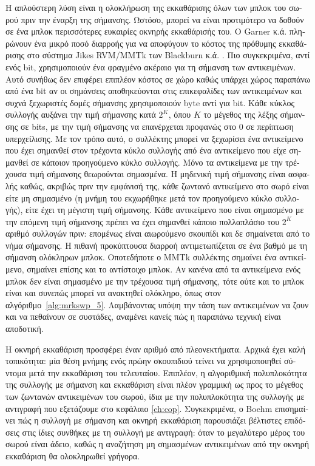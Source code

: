 \begin{greek}
Η απλούστερη λύση είναι η ολοκλήρωση της εκκαθάρισης όλων των
μπλοκ του σωρού πριν την έναρξη της σήμανσης. Ωστόσο, μπορεί
να είναι προτιμότερο να δοθούν σε ένα μπλοκ περισσότερες ευκαιρίες
οκνηρής εκκαθάρισής του. Ο Garner κ.ά. \cite{DBLP:conf/iwmm/GarnerBF07}
πληρώνουν ένα μικρό ποσό διαρροής για να αποφύγουν το κόστος
της πρόθυμης εκκαθάρισης στο σύστημα Jikes RVM/MMTk των Blackburn
κ.ά. \cite{DBLP:conf/iwmm/BlackburnH04}. Πιο συγκεκριμένα, αντί
ενός bit, χρησιμοποιούν ένα φραγμένο ακέραιο για τη σήμανση των
αντικειμένων. Αυτό συνήθως δεν επιφέρει επιπλέον κόστος σε χώρο
καθώς υπάρχει χώρος παραπάνω από ένα bit αν οι σημάνσεις αποθηκεύονται
στις επικεφαλίδες των αντικειμένων και συχνά ξεχωριστές δομές
σήμανσης χρησιμοποιούν byte αντί για bit. Κάθε κύκλος συλλογής
αυξάνει την τιμή σήμανσης κατά $2^K$, όπου $K$ το μέγεθος της
λέξης σήμανσης σε bits, με την τιμή σήμανσης να επανέρχεται
προφανώς στο $0$ σε περίπτωση υπερχείλισης. Με τον τρόπο αυτό,
ο συλλέκτης μπορεί να ξεχωρίσει ένα αντικείμενο που έχει σημανθεί
στον τρέχοντα κύκλο συλλογής από ένα αντικείμενο που είχε
σημανθεί σε κάποιον προηγούμενο κύκλο συλλογής. Μόνο τα αντικείμενα
με την τρέχουσα τιμή σήμανσης θεωρούνται σημασμένα. Η μηδενική
τιμή σήμανσης είναι ασφαλής καθώς, ακριβώς πριν την εμφάνισή
της, κάθε ζωντανό αντικείμενο στο σωρό είναι είτε μη σημασμένο
(η μνήμη του εκχωρήθηκε μετά τον προηγούμενο κύκλο συλλογής),
είτε έχει τη μέγιστη τιμή σήμανσης. Κάθε αντικείμενο που είναι
σημασμένο με την επόμενη τιμή σήμανσης πρέπει να έχει σημανθεί
κάποιο πολλαπλάσιο του $2^K$ αριθμό συλλογών πριν: επομένως
είναι αιωρούμενο σκουπίδι και δε σημαίνεται από το νήμα σήμανσης.
Η πιθανή προκύπτουσα διαρροή αντιμετωπίζεται σε ένα βαθμό
με τη σήμανση ολόκληρων μπλοκ. Οποτεδήποτε ο MMTk συλλέκτης
σημαίνει ένα αντικείμενο, σημαίνει επίσης και το αντίστοιχο
μπλοκ. Αν κανένα από τα αντικείμενα ενός μπλοκ δεν είναι
σημασμένο με την τρέχουσα τιμή σήμανσης, τότε ούτε και το
μπλοκ είναι και συνεπώς μπορεί να ανακτηθεί ολόκληρο, όπως
στον αλγόριθμο~\ref{alg:mrkswp_5}. Λαμβάνοντας υπόψη την τάση
των αντικειμένων να ζουν και να πεθαίνουν σε συστάδες,
αναμένει κανείς πώς η παραπάνω τεχνική είναι αποδοτική.

Η οκνηρή εκκαθάριση προσφέρει έναν αριθμό από πλεονεκτήματα.
Αρχικά έχει καλή τοπικότητα: μία θέση μνήμης ενός πρώην σκουπιδιού 
τείνει να χρησιμοποιηθεί σύντομα μετά την εκκαθάριση του τελευταίου.
Επιπλέον, η αλγοριθμική πολυπλοκότητα της συλλογής με σήμανση και
εκκαθάριση είναι πλέον γραμμική ως προς το μέγεθος των ζωντανών
αντικειμένων του σωρού, ίδια με την πολυπλοκότητα της συλλογής με
αντιγραφή που εξετάζουμε στο κεφάλαιο \ref{ch:cop}. Συγκεκριμένα,
ο Boehm \cite{boehm1995dynamic} επισημαίνει πώς η συλλογή με σήμανση και οκνηρή
εκκαθάριση παρουσιάζει βέλτιστες επιδόσεις στις ίδιες συνθήκες με
τη συλλογή με αντιγραφή: όταν το μεγαλύτερο μέρος του σωρού είναι
άδειο, καθώς η αναζήτηση μη σημασμένων αντικειμένων από την οκνηρή
εκκαθάριση θα ολοκληρωθεί γρήγορα.


\end{greek}
